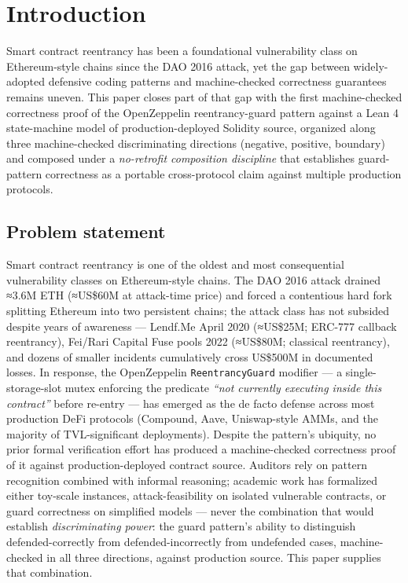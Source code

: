 \section{Introduction}\label{introduction}

Smart contract reentrancy has been a foundational vulnerability class on
Ethereum-style chains since the DAO 2016 attack, yet the gap between
widely-adopted defensive coding patterns and machine-checked correctness
guarantees remains uneven. This paper closes part of that gap with the
first machine-checked correctness proof of the OpenZeppelin
reentrancy-guard pattern against a Lean 4 state-machine model of
production-deployed Solidity source, organized along three
machine-checked discriminating directions (negative, positive, boundary)
and composed under a \emph{no-retrofit composition discipline} that
establishes guard-pattern correctness as a portable cross-protocol claim
against multiple production protocols.

\subsection{Problem statement}\label{problem-statement}

Smart contract reentrancy is one of the oldest and most consequential
vulnerability classes on Ethereum-style chains. The DAO 2016 attack
drained ≈3.6M ETH (≈US\$60M at attack-time price) and forced a
contentious hard fork splitting Ethereum into two persistent chains; the
attack class has not subsided despite years of awareness --- Lendf.Me
April 2020 (≈US\$25M; ERC-777 callback reentrancy), Fei/Rari Capital
Fuse pools 2022 (≈US\$80M; classical reentrancy), and dozens of smaller
incidents cumulatively cross US\$500M in documented losses. In response,
the OpenZeppelin \texttt{ReentrancyGuard} modifier --- a
single-storage-slot mutex enforcing the predicate \emph{``not currently
executing inside this contract''} before re-entry --- has emerged as the
de facto defense across most production DeFi protocols (Compound, Aave,
Uniswap-style AMMs, and the majority of TVL-significant deployments).
Despite the pattern's ubiquity, no prior formal verification effort has
produced a machine-checked correctness proof of it against
production-deployed contract source. Auditors rely on pattern
recognition combined with informal reasoning; academic work has
formalized either toy-scale instances, attack-feasibility on isolated
vulnerable contracts, or guard correctness on simplified models ---
never the combination that would establish \emph{discriminating power}:
the guard pattern's ability to distinguish defended-correctly from
defended-incorrectly from undefended cases, machine-checked in all three
directions, against production source. This paper supplies that
combination.

